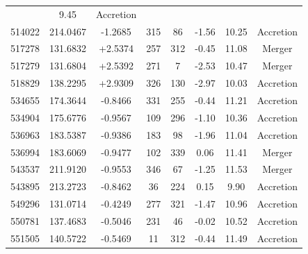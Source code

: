 \documentclass[fleqn,usenatbib]{mnras}
\begin{document}
\begin{table}
\begin{tabular*}{\linewidth}{cccccccc}
& 9.45%
& Accretion          \\
514022                    & 214.0467 & -1.2685  & 315                           & 86                          & -1.56%
& 10.25%
& Accretion          \\
517278                    & 131.6832 & +2.5374  & 257                           & 312                         & -0.45%
& 11.08%
& Merger             \\
517279                    & 131.6804 & +2.5392  & 271                           & 7                           & -2.53%
& 10.47%
& Merger             \\
518829                    & 138.2295 & +2.9309  & 326                           & 130                         & -2.97%
& 10.03%
& Accretion          \\
534655                    & 174.3644 & -0.8466  & 331                           & 255                         & -0.44%
& 11.21%
& Accretion          \\
534904                    & 175.6776 & -0.9567  & 109                           & 296                         & -1.10%
& 10.36%
& Accretion          \\
536963                    & 183.5387 & -0.9386  & 183                           & 98                          & -1.96%
& 11.04%
& Accretion          \\
536994                    & 183.6069 & -0.9477  & 102                           & 339                         & 0.06%
& 11.41%
& Merger             \\
543537                    & 211.9120 & -0.9553  & 346                           & 67                          & -1.25%
& 11.53%
& Merger             \\
543895                    & 213.2723 & -0.8462  & 36                            & 224                         & 0.15%
& 9.90%
& Accretion          \\
549296                    & 131.0714 & -0.4249  & 277                           & 321                         & -1.47%
& 10.96%
& Accretion          \\
550781                    & 137.4683 & -0.5046  & 231                           & 46                          & -0.02%
& 10.52%
& Accretion          \\
551505                    & 140.5722 & -0.5469  & 11                            & 312                         & -0.44%
& 11.49%
& Accretion          \\

\end{tabular*}
\end{table}
\end{document}
